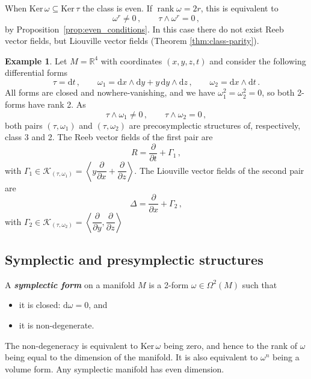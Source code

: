 \documentclass[11pt,twoside]{article}
\theoremstyle{plain}
\theoremstyle{definition}
\newtheorem{example}[theorem]{Example}
\newcommand{\R}{\mathbb{R}}
\renewcommand{\d}{\mathrm{d}}
\newcommand{\dparder}[2]{\dfrac{\partial #1}{\partial #2}}
\DeclareMathOperator{\rk}{rank}
\def\d{\mathrm{d}}
\newcommand\dfn[1]{{\textbf{\emph{#1}}}}
\newcommand{\fracp}[2]{\frac{\partial #1}{\partial #2}}
\def\d{\mathrm{d}}
\def\Ker{\mathrm{Ker \,}}
\def\K{\mathcal{K}}
\begin{document}
When  
$ \Ker \omega \subseteq \Ker \tau$ the class is even. 
If $\rk \omega = 2r$, this is equivalent to
$$
\omega^r\neq 0\,, \qquad 
\tau\wedge \omega^r =0\,,
$$
by Proposition~\ref{prop:even_conditions}.
In this case there do not exist Reeb vector fields,
but Liouville vector fields
(Theorem \ref{thm:class-parity}).

\begin{example}
    Let $M= \R^4$ with coordinates $(x,y,z,t)$ and consider the following differential forms
    $$
    \tau = \d t\,,  \qquad 
    \omega_1 = \d x \wedge \d y + y \,\d y \wedge \d z \,,\qquad  
    \omega_2 = \d x \wedge \d t \,. 
    $$
    All forms are closed and nowhere-vanishing, and we have $\omega_1^2 = \omega _2^2 = 0 $, so both 2-forms have rank 2. As
    $$
    \tau \wedge \omega_1 \neq 0\,, \qquad 
    \tau\wedge \omega_2 =0\,,
    $$
    both pairs $(\tau,\omega_1)$ and $(\tau,\omega_2)$ are precosymplectic structures of, respectively, class 3 and 2. 
    The Reeb vector fields of the first pair are 
    $$R = \fracp{}{t} + \Gamma_1\,,$$
    with 
    $\Gamma_1 \in \K_{(\tau,\omega_1)} = \left\langle  y\dparder{}{x}+\dparder{}{z}\right\rangle$.
    The Liouville vector fields of the second pair are
    $$\Delta  = \fracp{}{x } + \Gamma_2\,,$$
    with $\Gamma_2 \in \K_{(\tau,\omega_2)}= \left\langle \dparder{}{y},\dparder{}{z}\right\rangle$
\end{example}




\subsection{Symplectic and presymplectic structures}

A \dfn{symplectic form} on a manifold $M$ is a 2-form $\omega\in \Omega^2(M)$ such that
\begin{itemize}
\item 
it is closed:
$\d \omega = 0$, and
\item 
it is non-degenerate.
\end{itemize}
The non-degeneracy is equivalent to $\Ker \omega$ being zero, 
and hence to the rank of $\omega$ being equal to the dimension of the manifold. 
It is also equivalent to 
$\omega^n$ being a volume form.
Any symplectic manifold has even dimension.
\end{document}
